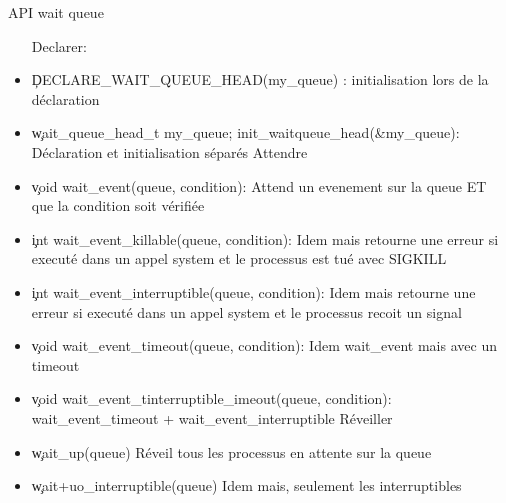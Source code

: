 \begin{frame}{API wait queue}
  \begin{itemize} 
Declarer:
  \item \c{DECLARE_WAIT_QUEUE_HEAD(my_queue)} : initialisation lors de la déclaration
  \item \c{wait_queue_head_t my_queue; init_waitqueue_head(&my_queue)}: Déclaration et initialisation séparés
Attendre
  \item \c{void wait_event(queue, condition)}: Attend un evenement sur la queue ET que la condition soit vérifiée
  \item \c{int wait_event_killable(queue, condition)}: Idem mais retourne une erreur si executé dans un appel system et le processus est tué avec SIGKILL
  \item \c{int wait_event_interruptible(queue, condition)}: Idem mais retourne une erreur si executé dans un appel system et le processus recoit un signal
  \item \c{void wait_event_timeout(queue, condition)}: Idem wait_event mais avec un timeout
  \item \c{void wait_event_tinterruptible_imeout(queue, condition)}: wait_event_timeout + wait_event_interruptible
Réveiller
\item \c{wait_up(queue)} Réveil tous les processus en attente sur la queue
\item \c{wait+uo_interruptible(queue)} Idem mais, seulement les interruptibles
  \end{itemize} 
\end{frame} 

